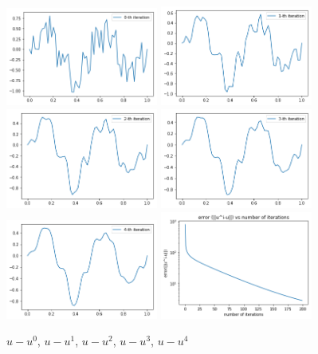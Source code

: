 
\begin{figure}[!ht]
\setlength{\abovecaptionskip}{0pt}
\setlength{\belowcaptionskip}{0pt}
\includegraphics[width=5cm]{figures/jianhongu0.png}\qquad
\includegraphics[width=5cm]{figures/jianhongu1.png}\qquad
\includegraphics[width=5cm]{figures/jianhongu2.png}\qquad
\includegraphics[width=5cm]{figures/jianhongu3.png}\qquad
\includegraphics[width=5cm]{figures/jianhongu4.png}\qquad
\includegraphics[width=5cm]{figures/jianhongGDerror.png}
\caption{\footnotesize{ $u-u^0$, $u-u^1$, $u-u^2$, $u-u^3$, $u-u^4$}}
\label{fig:Hmesh}
\end{figure}

